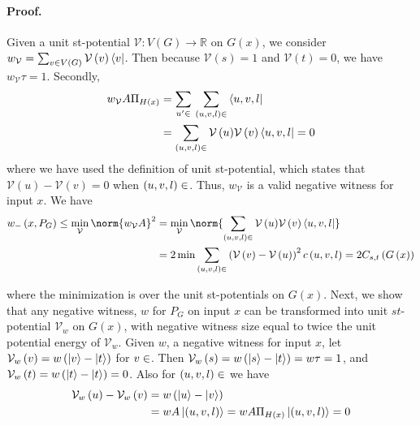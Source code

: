\paragraph{Proof.} Given a unit st-potential \( \mathcal{V} : V\left( G \right) \rightarrow \mathbb{R} \) on \( G \left(x\right) \), we consider \( w_{\mathcal{V}} = \sum_{v\in V\left( G \right) }{\mathcal{V} \left(v\right) \bra{v}}\). Then because \( \mathcal{V}\left(s\right) = 1  \) and \( \mathcal{V}\left(t\right) = 0 \), we have \( w_{\mathcal{V}}\tau = 1\). Secondly, 
\[
\begin{split}
    w_{\mathcal{V}}A\Pi_{H\left( x \right) } & = \sum_{u^\prime \in  }{  } \sum_{ \left(u,v,l\right) \in }{ \bra{u,v,l} } \\
    & = \sum_{\left(u,v,l\right) \in  }{ { \mathcal{V}\left(u \right) }{ \mathcal{V}\left(v \right) }  \bra{u,v,l} = 0  }
\end{split} 
\]
where we have used the definition of unit st-potential, which states that \( \mathcal{V}\left(u \right) - \mathcal{V}\left(v \right)  = 0 \) when \( \left(u,v,l\right) \in  \). Thus, \( w_{\mathcal{V}} \) is a valid negative witness for input \(x\). We have  
\[ 
\begin{split}
w_{-}\left(x , P_G \right) \le \min_{\mathcal{V}} \norm{ w_{\mathcal{V}} A}^2 & =  \min_{\mathcal{V}}\norm{\sum_{\left(u,v,l\right) \in \E }{ \Projx{ \mathcal{V}\left(u \right) }{ \mathcal{V}\left(v \right)} \bra{u,v,l}} } \\
& = 2 \min \sum_{\left(u,v,l\right) \in \E }{ \left( \mathcal{V}\left( v \right) -  \mathcal{V}\left( u \right) \right)^2 c\left(u,v,l\right) } = 2C_{s,t}\left(G\left( x \right) \right) 
\end{split}
\]

where the minimization is over the unit st-potentials on \( G \left( x \right) \). Next, we show that  any negative witness, \( w \) for \( P_G \) on input \(x\) can be transformed into unit \(st\)-potential \( \mathcal{V}_{w} \) on \( G \left(x\right) \), with negative witness size equal to twice the unit potential energy of \( \mathcal {V}_{w} \). Given \(w\), a negative witness for input \(x\), let \( \mathcal{V}_w \left(v\right) = w \left( \ket{v} - \ket{t} \right) \) for \( v \in  \). Then \( \mathcal{V}_w \left(s\right) = w \left( \ket{s} - \ket{t} \right) = w\tau = 1 \), and \( \mathcal{V}_w \left(t\right) = w \left( \ket{t} - \ket{t} \right) = 0 \). Also for \( \left(u,v,l\right) \in  \) we have \[
\begin{split}
    \mathcal{V}_w \left(u\right) - \mathcal{V}_w \left(v\right) & = w \left( \ket{u} - \ket{v} \right) \\ 
    & = wA\ket{\left(u,v,l\right)} = wA\Pi_{H\left(x\right)}\ket{\left(u,v,l\right)}  = 0
\end{split}
\]

